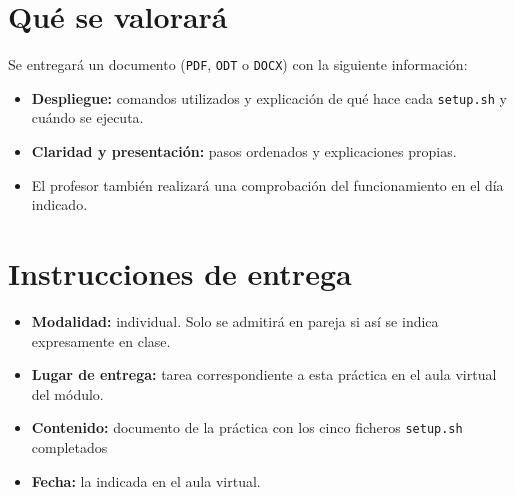 \documentclass[a4paper]{article}
\begin{document}
\section{Qué se valorará}
\label{sec:org0000009}

Se entregará un documento (\texttt{PDF}, \texttt{ODT} o \texttt{DOCX}) con la siguiente información:

\begin{itemize}
\item \textbf{Despliegue:} comandos utilizados y explicación de qué hace cada \texttt{setup.sh} y cuándo se ejecuta.
\item \textbf{Claridad y presentación:} pasos ordenados y explicaciones propias.
\item El profesor también realizará una comprobación del funcionamiento en el día indicado.
\end{itemize}
\section{Instrucciones de entrega}
\label{sec:org000000c}

\begin{itemize}
\item \textbf{Modalidad:} individual. Solo se admitirá en pareja si así se indica expresamente en clase.
\item \textbf{Lugar de entrega:} tarea correspondiente a esta práctica en el aula virtual del módulo.
\item \textbf{Contenido:} documento de la práctica con los cinco ficheros \texttt{setup.sh} completados
\item \textbf{Fecha:} la indicada en el aula virtual.
\end{itemize}
\end{document}
